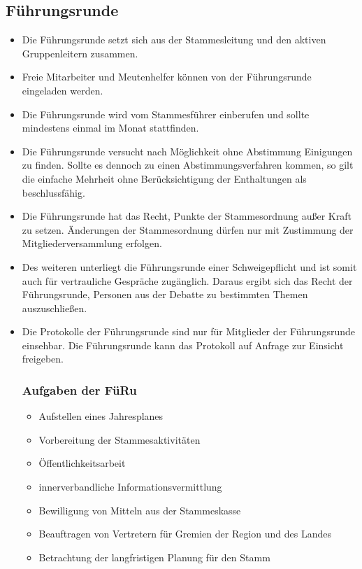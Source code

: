 \documentclass[a4paper]{article}
\begin{document}
    \subsection{Führungsrunde} %
    \label{sub:fuhrungsrunde}
	\begin{itemize}
		\item Die Führungsrunde setzt sich aus der Stammesleitung und den aktiven Gruppenleitern zusammen. 
		\item Freie Mitarbeiter und Meutenhelfer können von der Führungsrunde eingeladen werden. 
		\item Die Führungsrunde wird vom Stammesführer einberufen und sollte mindestens einmal im Monat stattfinden. 
		\item Die Führungsrunde versucht nach Möglichkeit ohne Abstimmung Einigungen zu finden. Sollte es dennoch zu einen Abstimmungsverfahren kommen, so gilt die einfache Mehrheit ohne Berücksichtigung der Enthaltungen als beschlussfähig. 
		\item Die Führungsrunde hat das Recht, Punkte der Stammesordnung außer Kraft zu setzen. Änderungen der Stammesordnung dürfen nur mit Zustimmung der Mitgliederversammlung erfolgen. 
		\item Des weiteren unterliegt die Führungsrunde einer Schweigepflicht und ist somit auch für vertrauliche Gespräche zugänglich. Daraus ergibt sich das Recht der Führungsrunde, Personen aus der Debatte zu bestimmten Themen auszuschließen. 
		\item Die Protokolle der Führungsrunde sind nur für Mitglieder der Führungsrunde einsehbar. Die Führungsrunde kann das Protokoll auf Anfrage zur Einsicht freigeben.
		\subsubsection{Aufgaben der FüRu} %
		\label{ssub:aufgaben_der_furu}
		\begin{itemize}
		    \item Aufstellen eines Jahresplanes 
			\item Vorbereitung der Stammesaktivitäten 
			\item Öffentlichkeitsarbeit 
			\item innerverbandliche Informationsvermittlung 
			\item Bewilligung von Mitteln aus der Stammeskasse 
			\item Beauftragen von Vertretern für Gremien der Region und des Landes 
            \item Betrachtung der langfristigen Planung für den Stamm
		\end{itemize}
	\end{itemize}
    
\end{document}
